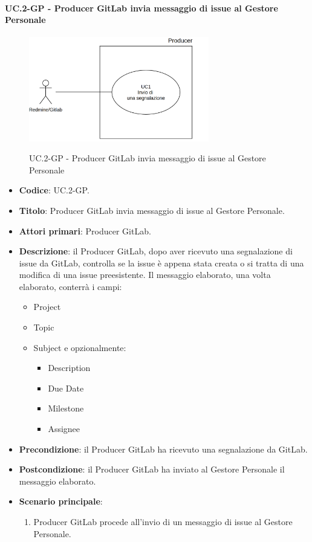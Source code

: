 		\paragraph{UC\theuccount.2-GP -  Producer GitLab invia messaggio di issue al Gestore Personale}
			\begin{figure}[H]
				\centering
				\includegraphics[width=0.7\textwidth]{img/UC1.png}\\
				\caption{UC\theuccount.2-GP -  Producer GitLab invia messaggio di issue al Gestore Personale}
			\end{figure}
			\begin{itemize}
				\item \textbf{Codice}: UC\theuccount.2-GP.
				\item \textbf{Titolo}:  Producer GitLab invia messaggio di issue al Gestore Personale.
				\item \textbf{Attori primari}: Producer GitLab.
				\item \textbf{Descrizione}: il Producer GitLab, dopo aver ricevuto una segnalazione di issue da GitLab,
				controlla se la issue è appena stata creata o si tratta di una modifica di
				una issue preesistente. Il messaggio elaborato, una volta elaborato, conterrà i campi:
				\begin{itemize}
					\item Project
					\item Topic
					\item Subject e opzionalmente:
					\begin{itemize}
						\item Description
						\item Due Date
						\item Milestone
						\item Assignee
					\end{itemize}
				\end{itemize}
				\item \textbf{Precondizione}: il Producer GitLab ha ricevuto una segnalazione da GitLab.
				\item \textbf{Postcondizione}: il Producer GitLab ha inviato al Gestore Personale il messaggio \newline elaborato.
				\item \textbf{Scenario principale}: 
				\begin{enumerate}
					\item Producer GitLab procede all'invio di un messaggio di
					issue al Gestore Personale.
				\end{enumerate}
				
			\end{itemize}
		
